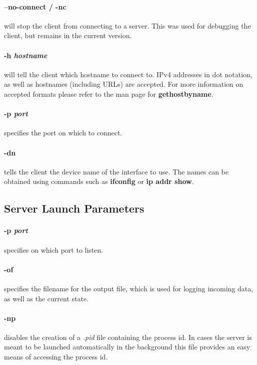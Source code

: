 \paragraph{--no-connect / -nc} will stop the client from connecting to a server.
This was used for debugging the client, but remains in the current version.

\paragraph{-h \textit{hostname}} will tell the client which hostname to connect to.
IPv4 addresses in dot notation, as well as hostnames (including URLs) are accepted.
For more information on accepted formats please refer to the man page for \textbf{gethostbyname}.

\paragraph{-p \textit{port}} specifies the port on which to connect.

\paragraph{-dn} tells the client the device name of the interface to use.
The names can be obtained using commands such as \textbf{ifconfig} or \textbf{ip addr show}.

\subsection*{Server Launch Parameters}
\paragraph{-p \textit{port}} specifies on which port to listen.

\paragraph{-of} specifies the filename for the output file, which is used for logging incoming data, as well as the current state.

\paragraph{-np} disables the creation of a \textit{.pid} file containing the process id.
In cases the server is meant to be launched automatically in the background this file provides an easy means of accessing the process id.

